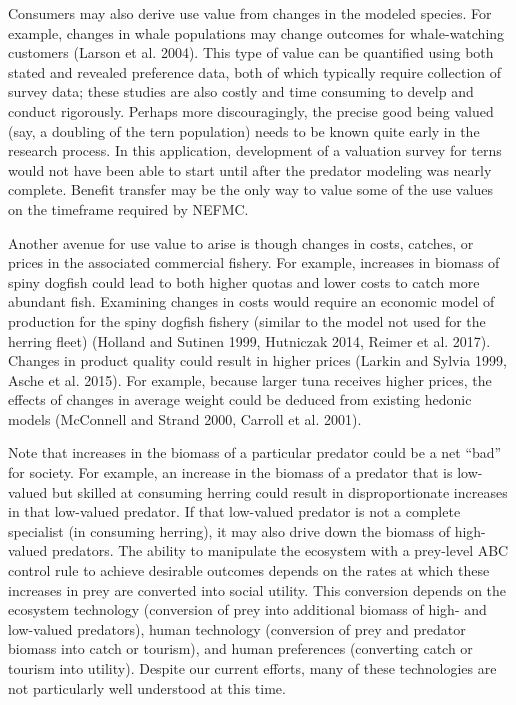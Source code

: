 \documentclass[]{article}
\begin{document}
Consumers may also derive use value from changes in the modeled species.
For example, changes in whale populations may change outcomes for
whale-watching customers (Larson et al. 2004). This type of value can be
quantified using both stated and revealed preference data, both of which
typically require collection of survey data; these studies are also
costly and time consuming to develp and conduct rigorously. Perhaps more
discouragingly, the precise good being valued (say, a doubling of the
tern population) needs to be known quite early in the research process.
In this application, development of a valuation survey for terns would
not have been able to start until after the predator modeling was nearly
complete. Benefit transfer may be the only way to value some of the use
values on the timeframe required by NEFMC.

Another avenue for use value to arise is though changes in costs,
catches, or prices in the associated commercial fishery. For example,
increases in biomass of spiny dogfish could lead to both higher quotas
and lower costs to catch more abundant fish. Examining changes in costs
would require an economic model of production for the spiny dogfish
fishery (similar to the model not used for the herring fleet) (Holland
and Sutinen 1999, Hutniczak 2014, Reimer et al. 2017). Changes in
product quality could result in higher prices (Larkin and Sylvia 1999,
Asche et al. 2015). For example, because larger tuna receives higher
prices, the effects of changes in average weight could be deduced from
existing hedonic models (McConnell and Strand 2000, Carroll et al.
2001).

Note that increases in the biomass of a particular predator could be a
net ``bad'' for society. For example, an increase in the biomass of a
predator that is low-valued but skilled at consuming herring could
result in disproportionate increases in that low-valued predator. If
that low-valued predator is not a complete specialist (in consuming
herring), it may also drive down the biomass of high-valued predators.
The ability to manipulate the ecosystem with a prey-level ABC control
rule to achieve desirable outcomes depends on the rates at which these
increases in prey are converted into social utility. This conversion
depends on the ecosystem technology (conversion of prey into additional
biomass of high- and low-valued predators), human technology (conversion
of prey and predator biomass into catch or tourism), and human
preferences (converting catch or tourism into utility). Despite our
current efforts, many of these technologies are not particularly well
understood at this time.
\end{document}
